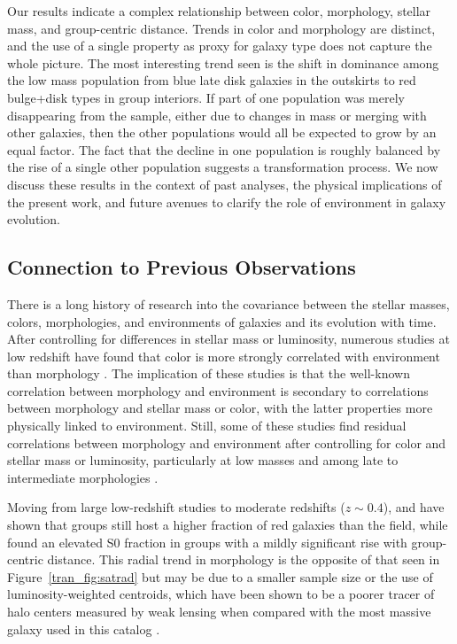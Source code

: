 Our results indicate a complex relationship between color, morphology,
stellar mass, and group-centric distance. Trends in color and
morphology are distinct, and the use of a single property as proxy for
galaxy type does not capture the whole picture. The most interesting
trend seen is the shift in dominance among the low mass population
from blue late disk galaxies in the outskirts to red bulge+disk types
in group interiors. If part of one population was merely disappearing
from the sample, either due to changes in mass or merging with other
galaxies, then the other populations would all be expected to grow by
an equal factor. The fact that the decline in one population is
roughly balanced by the rise of a single other population suggests a
transformation process. We now discuss these results in the context of
past analyses, the physical implications of the present work, and
future avenues to clarify the role of environment in galaxy evolution.

\subsection{Connection to Previous Observations}

There is a long history of research into the covariance between the
stellar masses, colors, morphologies, and environments of galaxies and
its evolution with time. After controlling for differences in stellar
mass or luminosity, numerous studies at low redshift have found that color is more
strongly correlated with environment than morphology
\citep[e.g.,][]{Kauffmann2004, Blanton2005, Christlein2005, vandenBosch2008,
  Bamford2009, Skibba2009, Weinmann2009}. The implication of these
studies is that the well-known correlation between morphology and
environment is secondary to correlations between morphology and
stellar mass or color, with the latter properties more physically
linked to environment. Still, some of these studies find residual
correlations between morphology and environment after controlling for
color and stellar mass or luminosity, particularly at low masses and
among late to intermediate morphologies \citep{Blanton2005,
  Weinmann2009, Skibba2012}.

Moving from large low-redshift studies to moderate redshifts ($z\sim0.4$), \citet{Balogh2009} and
\citet{McGee2011} have shown that groups still host a higher fraction of red
galaxies than the field, while \citet{Wilman2009} found
an elevated S0 fraction in groups with a mildly significant rise with
group-centric distance. This radial trend in morphology is the opposite of that seen
in Figure~\ref{tran_fig:satrad} but may be due to a smaller sample size or
the use of luminosity-weighted centroids, which have been shown to be
a poorer tracer of halo centers measured by weak lensing when compared
with the most massive galaxy used in this catalog \citep{George2012}.

